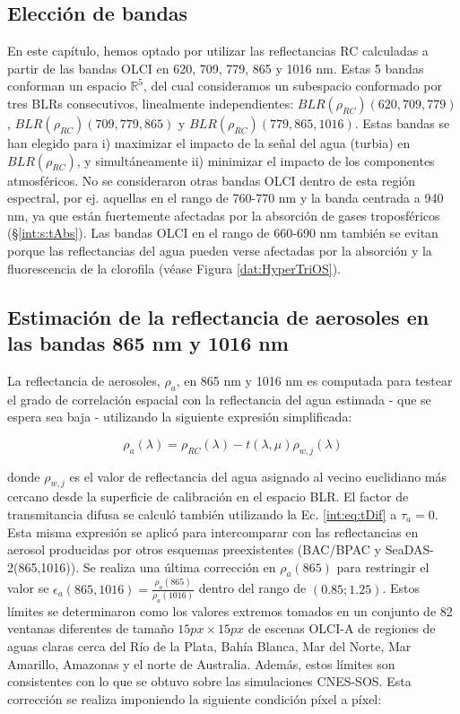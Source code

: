     \subsection{Elección de bandas}
    \label{blr:s:bandchoice}
    
        En este capítulo, hemos optado por utilizar las reflectancias RC calculadas a partir de las bandas OLCI en 620, 709, 779, 865 y 1016 nm. Estas 5 bandas conforman un espacio $\mathbb{R}^{5}$, del cual consideramos un subespacio conformado por tres BLRs consecutivos, linealmente independientes: $BLR(\rho_{RC})(620, 709, 779)$, $BLR(\rho_{RC})(709, 779, 865)$ y $BLR(\rho_{RC})(779, 865, 1016)$. Estas bandas se han elegido para i) maximizar el impacto de la señal del agua (turbia) en $BLR(\rho_{RC})$, y simultáneamente ii) minimizar el impacto de los componentes atmosféricos. No se consideraron otras bandas OLCI dentro de esta región espectral, por ej. aquellas en el rango de 760-770 nm y la banda centrada a 940 nm, ya que están fuertemente afectadas por la absorción de gases troposféricos (\S \ref{int:s:tAbs}). Las bandas OLCI en el rango de 660-690 nm también se evitan porque las reflectancias del agua pueden verse afectadas por la absorción y la fluorescencia de la clorofila (véase Figura \ref{dat:HyperTriOS}).

    \subsection{Estimación de la reflectancia de aerosoles en las bandas 865 nm y 1016 nm}
    \label{blr:s:residual}

        La reflectancia de aerosoles, $\rho_{a}$, en 865 nm y 1016 nm es computada para testear el grado de correlación espacial con la reflectancia del agua estimada - que se espera sea baja - utilizando la siguiente expresión simplificada:
        
        \begin{equation}
            \rho_{a}(\lambda) = \rho_{RC}(\lambda) - t(\lambda,\mu)\rho_{w,j}(\lambda)
            \label{blr:eq:residual}
        \end{equation}
        
        \noindent donde $\rho_{w,j}$ es el valor de reflectancia del agua asignado al vecino euclidiano más cercano desde la superficie de calibración en el espacio BLR.
        El factor de transmitancia difusa se calculó también utilizando la Ec. \ref{int:eq:tDif} a $\tau_{a}=0$. Esta misma expresión se aplicó para intercomparar con las reflectancias en aerosol producidas por otros esquemas preexistentes (BAC/BPAC y SeaDAS-2(865,1016)).
        Se realiza una última corrección en $\rho_{a}(865)$ para restringir el valor se $\epsilon_{a}(865,1016)=\frac{\rho_{a}(865)}{\rho_{a}(1016)}$ dentro del rango de $(0.85; 1.25)$. Estos límites se determinaron como los valores extremos tomados en un conjunto de 82 ventanas diferentes de tamaño $15px \times 15px$ de escenas OLCI-A de regiones de aguas claras cerca del Río de la Plata, Bahía Blanca, Mar del Norte, Mar Amarillo, Amazonas y el norte de Australia. Además, estos límites son consistentes con lo que se obtuvo sobre las simulaciones CNES-SOS. Esta corrección se realiza imponiendo la siguiente condición píxel a píxel:
        
